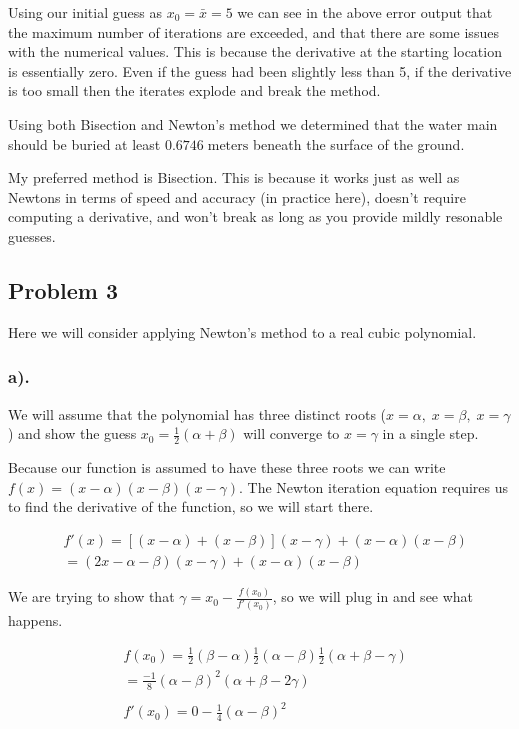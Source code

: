 \documentclass[11pt]{article}
\begin{document}
    Using our initial guess as \(x_0=\bar{x}=5\) we can see in the above
error output that the maximum number of iterations are exceeded, and
that there are some issues with the numerical values. This is because
the derivative at the starting location is essentially zero. Even if the
guess had been slightly less than 5, if the derivative is too small then
the iterates explode and break the method.

Using both Bisection and Newton's method we determined that the water
main should be buried at least \(\boxed{0.6746\;\text{meters}}\) beneath
the surface of the ground.

My preferred method is Bisection. This is because it works just as well
as Newtons in terms of speed and accuracy (in practice here), doesn't
require computing a derivative, and won't break as long as you provide
mildly resonable guesses.
\newpage
    \hypertarget{problem-3}{%
\subsection*{Problem 3}\label{problem-3}}

Here we will consider applying Newton's method to a real cubic
polynomial.

    \hypertarget{a.}{%
\subsubsection*{a).}\label{a.}}

We will assume that the polynomial has three distinct roots
(\(x=\alpha,\; x=\beta,\;x=\gamma\)) and show the guess
\(x_0=\frac{1}{2}(\alpha+\beta)\) will converge to \(x=\gamma\) in a
single step.

    Because our function is assumed to have these three roots we can write
\(f(x) = (x-\alpha)(x-\beta)(x-\gamma)\). The Newton iteration equation
requires us to find the derivative of the function, so we will start
there.

\begin{align}
    &f'(x) = [(x-\alpha)+(x-\beta)](x-\gamma)+(x-\alpha)(x-\beta)\\
    &=(2x-\alpha-\beta)(x-\gamma)+(x-\alpha)(x-\beta)
\end{align}

    We are trying to show that \(\gamma = x_0 - \frac{f(x_0)}{f'(x_0)}\), so
we will plug in and see what happens.

\begin{align}
    &f(x_0) = \frac{1}{2}(\beta-\alpha)\frac{1}{2}(\alpha-\beta)\frac{1}{2}(\alpha+\beta-\gamma)\\
    &=\frac{-1}{8}(\alpha-\beta)^2(\alpha+\beta-2\gamma)\\
    &~\\
    &f'(x_0) = 0 - \frac{1}{4}(\alpha-\beta)^2
\end{align}
\end{document}
